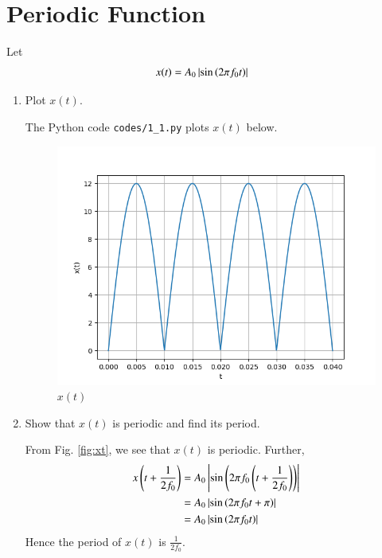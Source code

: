 \documentclass[journal,12pt,twocolumn]{IEEEtran}
\renewcommand\thesection{\arabic{section}}
\begin{document}
\section{Periodic Function}
Let 
\begin{align}
	x(t) &= A_0\left\vert\sin\left(2\pi f_0 t\right)\right\vert
	\label{eq:10-orig-diff-def}
\end{align}
\begin{enumerate}[label=\thesection.\arabic*
,ref=\thesection.\theenumi]
\item Plot $x(t)$.

\solution The Python code \texttt{codes/1\_1.py} plots $x(t)$ below.
\begin{figure}[!htp]
    \includegraphics[width=\columnwidth]{figs/1_1.png}
    \caption{$x(t)$}
    \label{fig:xt}
\end{figure}
\item Show that $x(t)$ is periodic and find its period.

\solution From Fig. \eqref{fig:xt}, we see that $x(t)$ is periodic. Further,
\begin{align}
    x\left(t+\frac{1}{2f_0}\right) &= A_0\left\vert\sin\left(2\pi f_0\left(t + \frac{1}{2f_0}\right)\right)\right\vert \\
                            &= A_0\left\vert\sin\left(2\pi f_0t + \pi\right)\right\vert \\
                            &= A_0\left\vert\sin\left(2\pi f_0t\right)\right\vert
\end{align}
Hence the period of $x(t)$ is $\frac{1}{2f_0}$.
\end{enumerate}
\end{document}
